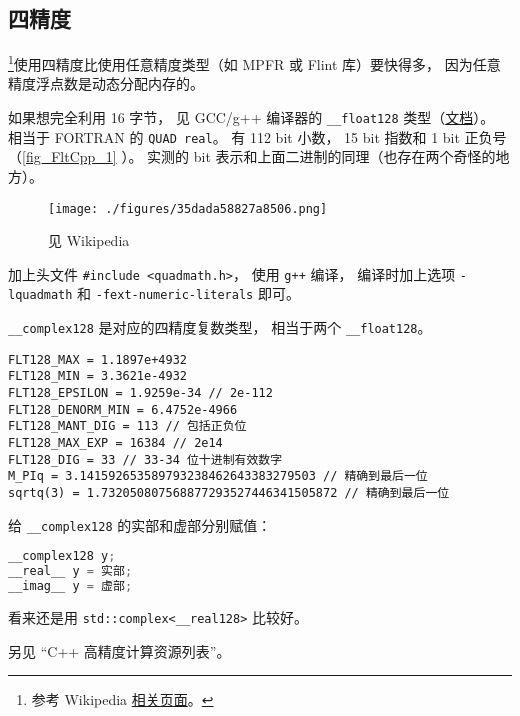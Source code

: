 \subsection{四精度}
\footnote{参考 Wikipedia \href{https://en.wikipedia.org/wiki/Quadruple-precision_floating-point_format}{相关页面}。}使用四精度比使用任意精度类型（如 MPFR 或 Flint 库）要快得多， 因为任意精度浮点数是动态分配内存的。

如果想完全利用 16 字节， 见 GCC/g++ 编译器的 \verb|__float128| 类型（\href{https://gcc.gnu.org/onlinedocs/gcc-8.1.0/libquadmath.pdf}{文档}）。 相当于 FORTRAN 的 \verb|QUAD real|。 有 112 bit 小数， 15 bit 指数和 1 bit 正负号（\autoref{fig_FltCpp_1} ）。 实测的 bit 表示和上面二进制的同理（也存在两个奇怪的地方）。

\begin{figure}[ht]
\centering
\texttt{[image: ./figures/35dada58827a8506.png]}
\caption{见 Wikipedia} \label{fig_FltCpp_1}
\end{figure}


加上头文件 \verb|#include <quadmath.h>|， 使用 \verb|g++| 编译， 编译时加上选项 \verb|-lquadmath| 和 \verb|-fext-numeric-literals| 即可。

\verb|__complex128| 是对应的四精度复数类型， 相当于两个 \verb|__float128|。

\begin{lstlisting}[language=none]
FLT128_MAX = 1.1897e+4932
FLT128_MIN = 3.3621e-4932
FLT128_EPSILON = 1.9259e-34 // 2e-112
FLT128_DENORM_MIN = 6.4752e-4966
FLT128_MANT_DIG = 113 // 包括正负位
FLT128_MAX_EXP = 16384 // 2e14
FLT128_DIG = 33 // 33-34 位十进制有效数字
M_PIq = 3.141592653589793238462643383279503 // 精确到最后一位
sqrtq(3) = 1.732050807568877293527446341505872 // 精确到最后一位
\end{lstlisting}

给 \verb|__complex128| 的实部和虚部分别赋值：
\begin{lstlisting}[language=cpp]
__complex128 y;
__real__ y = 实部;
__imag__ y = 虚部;
\end{lstlisting}
看来还是用 \verb|std::complex<__real128>| 比较好。

另见 “C++ 高精度计算资源列表”。
